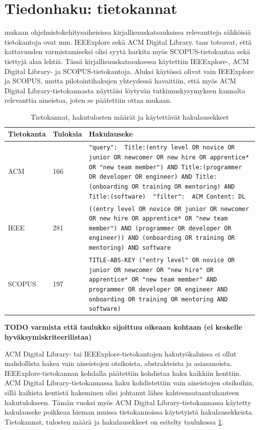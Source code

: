 \documentclass[utf8]{gradu3}
\begin{document}
\section{Tiedonhaku: tietokannat}

\textcite{brereton-ym-2007} mukaan ohjelmistokehitysaiheisissa kirjallisuuskatsauksissa relevantteja sähköisiä tietokantoja ovat mm. IEEExplore sekä ACM Digital Library. \textcite{kitchenham-charters-2007} taas toteavat, että kattavuuden varmistamiseksi olisi syytä harkita myös SCOPUS-tietokantaa sekä tiettyjä alan lehtiä. 
Tässä kirjallisuuskatsauksessa käytettiin IEEExplore-, ACM Digital Library- ja SCOPUS-tietokantoja. Aluksi käytössä olivat vain IEEExplore ja SCOPUS, mutta pilotointihakujen yhteydessä havaittiin, että myös ACM Digital Library-tietokannasta näyttäisi löytyvän tutkimuskysymyksen kannalta relevanttia aineistoa, joten se päätettiin ottaa mukaan.

\begin{table}[h]
    \begin{tabular}{llp{}}
        \toprule
        {Tietokanta} & Tuloksia & Hakulauseke \\
        \midrule
        ACM & 166 & {\tt "query": { Title:(entry level OR novice OR junior OR newcomer OR new hire OR apprentice* OR "new team member") AND Title:(programmer OR developer OR engineer) AND Title:(onboarding OR training OR mentoring) AND Title:(software) } "filter": { ACM Content: DL }  } \\
        \midrule
        IEEE & 281 & {\tt ((entry level OR novice OR junior OR newcomer OR new hire OR apprentice* OR "new team member") AND (programmer OR  developer OR engineer)) AND (onboarding OR training OR mentoring) AND software } \\
        \midrule
        SCOPUS & 197 & {\tt TITLE-ABS-KEY ("entry level"  OR  novice  OR  junior  OR  newcomer OR "new hire"  OR  apprentice* OR "new team member"  AND  programmer  OR  developer  OR  engineer  AND  onboarding  OR  training  OR  mentoring  AND  software)  } \\
        \bottomrule
    \end{tabular}  
    \caption{Tietokannat, hakutulosten määrät ja käytettävät hakulausekkeet}
    \label{tbl:tietokannat}
\end{table}

\textbf{TODO varmista että taulukko sijoittuu oikeaan kohtaan (ei keskelle hyväksymiskriteerilistaa)}

ACM Digital Library- tai IEEExplore-tietokantojen hakutyökaluissa ei ollut mahdollista hakea vain aineistojen otsikoista, abstrakteista ja asiasanoista. IEEExplore-tietokannan kohdalla päätettiin kohdistaa haku kaikkiin kenttiin. ACM Digital Library-tietokannassa haku kohdistettiin vain aineistojen otsikoihin, sillä kaikista kentistä hakeminen olisi johtanut lähes kahteensataantuhanteen hakutulokseen. Tämän vuoksi myös ACM Digital Library-tietokannassa käytetty hakulauseke poikkeaa hieman muissa tietokannoissa käytetyistä hakulausekkeista. Tietokannat, tulosten määrä ja hakulausekkeet on esitelty taulukossa \ref{tbl:tietokannat}.
\end{document}
